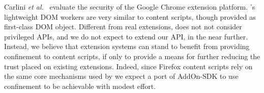 Carlini \emph{et al.}~\cite{Carlini:2012} evaluate the security of the
Google Chrome extension platform.
%
\sys{}'s lightweight DOM workers are very similar to content scripts,
though provided as first-class DOM object.
%
Different from real extensions, \sys{} does not not consider
privileged APIs, and we do not expect to extend our API, in the near
further.
%
Instead, we believe that extension systems can stand to benefit from
providing confinement to content scripts, if only to provide a means
for further reducing the trust placed on existing extensions.
%
Indeed, since Firefox content scripts rely on the same core mechanisms
used by \sys{} we expect a port of AddOn-SDK to use confinement to be
achievable with modest effort.
 

